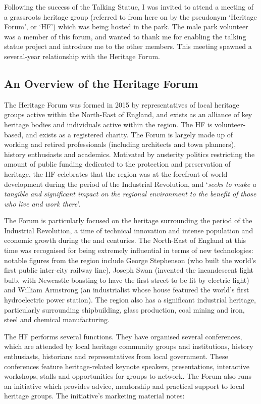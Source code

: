 Following the success of the Talking Statue, I was invited to attend a meeting of a grassroots heritage group (referred to from here on by the pseudonym `Heritage Forum', or `HF') which was being hosted in the park. The male park volunteer was a member of this forum, and wanted to thank me for enabling the talking statue project and introduce me to the other members. This meeting spawned a several-year relationship with the Heritage Forum.

\subsection{An Overview of the Heritage Forum}
The Heritage Forum was formed in 2015 by representatives of local heritage groups active within the North-East of England, and exists as an alliance of key heritage bodies and individuals active within the region. The HF is volunteer-based, and exists as a registered charity. The Forum is largely made up of working and retired professionals (including architects and town planners), history enthusiasts and academics. Motivated by austerity politics restricting the amount of public funding dedicated to the protection and preservation of heritage, the HF celebrates that the region was at the forefront of world development during the period of the Industrial Revolution, and `\textit{seeks to make a tangible and significant impact on the regional environment to the benefit of those who live and work there}'.

The Forum is particularly focused on the heritage surrounding the period of the Industrial Revolution, a time of technical innovation and intense population and economic growth during the  and  centuries. The North-East of England at this time was recognised for being extremely influential in terms of new technologies: notable figures from the region include George Stephenson (who built the world's first public inter-city railway line), Joseph Swan (invented the incandescent light bulb, with Newcastle boasting to have the first street to be lit by electric light) and William Armstrong (an industrialist whose house featured the world's first hydroelectric power station). The region also has a significant industrial heritage, particularly surrounding shipbuilding, glass production, coal mining and iron, steel and chemical manufacturing. 

The HF performs several functions. They have organised several conferences, which are attended by local heritage community groups and institutions, history enthusiasts, historians and representatives from local government. These conferences feature heritage-related keynote speakers, presentations, interactive workshops, stalls and opportunities for groups to network. The Forum also runs an initiative which provides advice, mentorship and practical support to local heritage groups. The initiative's marketing material notes:

